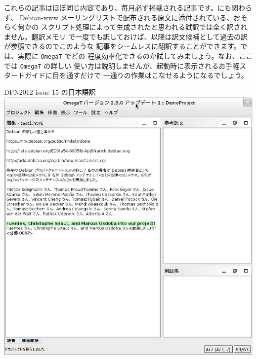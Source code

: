 \documentclass[mingoth,a4paper]{jsarticle}
\begin{document}
これらの記事はほぼ同じ内容であり、毎月必ず掲載される記事です。にも関わらず、
Debian-www メーリングリストで配布される原文に添付されている、おそらく何かの
スクリプト処理によって生成されたと思われる試訳では全く訳されません。翻訳メモリ
で一度でも訳しておけば、以降は訳文候補として過去の訳が参照できるのでこのような
記事をシームレスに翻訳することができます。では、実際に {\tt OmegaT} でどの
程度効率化できるのか試してみましょう。なお、ここでは {\tt OmegaT} の詳しい
使い方は説明しませんが、起動時に表示されるお手軽スタートガイドに目を通すだけで
一通りの作業はこなせるようになるでしょう。

\begin{itembox}[l]{DPN2012 issue 15 の日本語訳}
    \includegraphics{image201210/omegat_demo1.eps}
\end{itembox}
\end{document}
